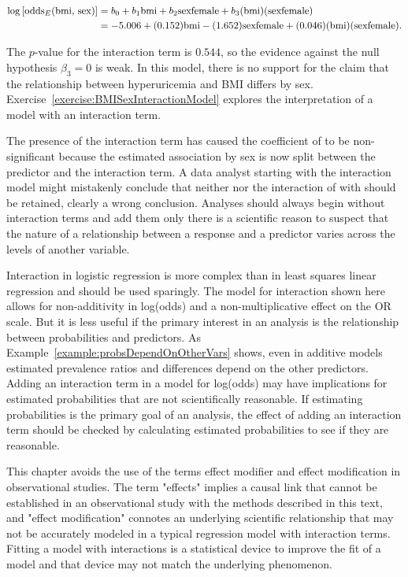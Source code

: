 \begin{align}
  \log\left[\text{odds}_E(\text{bmi, sex})\right] &= b_0 + b_1\text{bmi}
  + b_2\text{sexfemale} + b_3\text{(bmi)(sexfemale)} \notag \\
  &= -5.006 + (0.152)\text{bmi}
  -(1.652)\text{sexfemale} + (0.046)\text{(bmi)(sexfemale)}.
  \label{eqn:huBmiSexInteractionLogReg}
\end{align}

The $p$-value for the interaction term is $0.544$, so the evidence against the null hypothesis $\beta_3 = 0$ is weak.  In this model, there is no support for the claim that the relationship between hyperuricemia and BMI differs by sex.  Exercise~\ref{exercise:BMISexInteractionModel} explores the interpretation of a model with an interaction term.

The presence of the interaction term has caused the coefficient of  to be non-significant because the estimated association by sex is now split between the predictor  and the interaction term.  A data analyst starting with the interaction model might mistakenly conclude that neither  nor the interaction of  with  should be retained, clearly a wrong conclusion.  Analyses should always begin without interaction terms and add them only there is a scientific reason to suspect that the nature of a relationship between a response and a predictor varies across the levels of another variable.

Interaction in logistic regression is more complex than in least squares linear regression and should be used sparingly. The model for interaction shown here allows for non-additivity in log(odds) and  a non-multiplicative effect on the OR scale. But it is less useful if the primary interest in an analysis is the relationship between probabilities and predictors.  As Example~\ref{example:probsDependOnOtherVars} shows, even in additive models estimated prevalence ratios and differences depend on the other predictors.  Adding an interaction term in a model for log(odds) may have implications for estimated probabilities that are not scientifically reasonable.  If estimating probabilities is the primary goal of an analysis, the effect of adding an interaction term should be checked by calculating estimated probabilities to see if they are reasonable.



This chapter avoids the use of the terms effect modifier and effect modification in observational studies. The term "effects" implies a causal link that cannot be established in an observational study with the methods described in this text, and "effect modification" connotes an underlying scientific relationship that may not be accurately modeled in a typical regression model with interaction terms.  Fitting a model with interactions is a statistical device to improve the fit of a model and that device may not match the underlying phenomenon.

